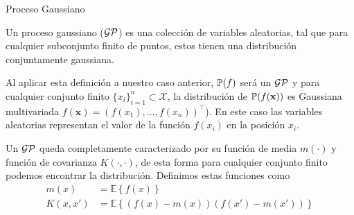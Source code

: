 \documentclass[9pt]{beamer}
\begin{document}
\begin{frame}{Proceso Gaussiano}

\begin{definition}
  Un proceso gaussiano ($\mathcal{GP}$) es una colección de variables aleatorias, tal que para cualquier subconjunto finito de puntos, estos tienen una distribución conjuntamente gaussiana.
\end{definition} \pause

Al aplicar esta definición a nuestro caso anterior, $\mathbb{P}(f)$ será un $\mathcal{GP}$ y para cualquier conjunto finito $\{ x_i\}_{i=1}^{n}  \subset \mathcal{X}$, la distribución de $\mathbb{P}(f(\mathbf{x}))$ es Gaussiana multivariada $f(\mathbf{x})=(f(x_1), \ldots, f(x_n))^\top$). En este caso las variables aleatorias representan el valor de la función $f(x_i)$ en la posición $x_i$. \pause
\vspace{0.2cm}

Un $\mathcal{GP}$ queda completamente caracterizado por su función de media $m(\cdot)$ y función de covarianza $K(\cdot, \cdot)$, de esta forma para cualquier conjunto finito podemos encontrar la distribución. Definimos estas funciones como
\begin{align*}
  m(x) & = \mathbb{E}\left\{f(x)\right\}\\
  K(x, x') & = \mathbb{E}\left\{\left(f(x) - m(x)\right) \left(f(x') - m(x') \right)\right\}
\end{align*}


\end{frame}
\end{document}
